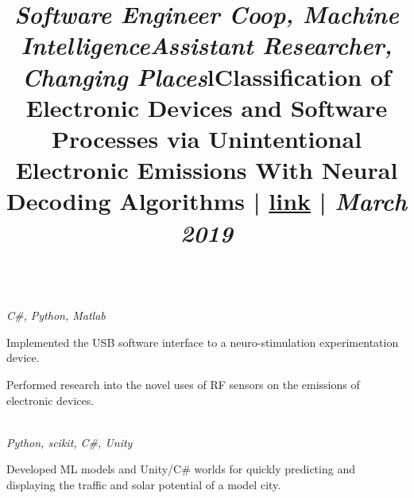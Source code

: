 \documentclass[margin,line,11pt,letterpaper]{style}
\let\oldsection\section
\renewcommand{\section}[1]{\vspace{-2mm}\oldsection{\small\sc {#1}}}
\begin{document}
\begin{resume}
    \vspace{-1mm}
    \title{\textit{Software Engineer Coop, Machine Intelligence}}
    \begin{position}
        \vspace{-4mm}\\
        \emph{C\#, Python, Matlab}
        \begin{list2}
            \item Implemented the USB software interface to a neuro-stimulation experimentation device.
            \item Performed research into the novel uses of RF sensors on the emissions of electronic devices.
        \end{list2}
    \end{position}
    
    \vspace{-1mm}
    \title{\textit{Assistant Researcher, Changing Places}}
    \begin{position}
        \vspace{-4mm}\\
        \emph{Python, scikit, C\#, Unity}
        \begin{list2}
            \item Developed ML models and Unity/C\# worlds for quickly predicting and displaying the traffic and solar potential of a model city.
        \end{list2}
    \end{position}

    \section{Publications}
    
    \begin{format}
        \title{l}\\
        \\
    \end{format}
    
    \title{\textbf{Classification of Electronic Devices and Software Processes via Unintentional Electronic Emissions With Neural Decoding Algorithms} | \href{https://ieeexplore.ieee.org/document/8674781}{link} | \textit{March 2019}}
    \begin{position}
    \end{position}
    

\end{resume}
\end{document}
